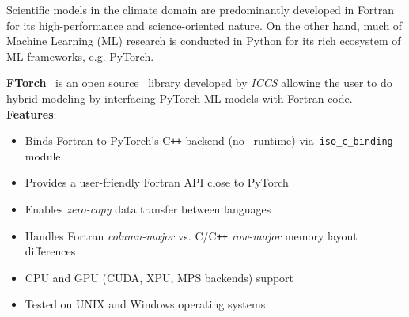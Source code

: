 Scientific models in the climate domain are predominantly developed in Fortran for its high-performance and science-oriented nature. On the other hand, much of Machine Learning (ML) research is conducted in Python for its rich ecosystem of ML frameworks, e.g. PyTorch. 

\textbf{FTorch}~\citep{Atkinson2025} is an open source \href{https://github.com/Cambridge-ICCS/FTorch}{\textcolor{black}{\faGithub}}~library developed by \emph{ICCS} allowing the user to do hybrid modeling by interfacing PyTorch ML models with Fortran code. \\
\textbf{Features}:
\begin{itemize}
    \item Binds Fortran to PyTorch's C\texttt{++} backend (no \faPython~runtime) via~\texttt{iso\_c\_binding} module
    \item Provides a user-friendly Fortran API close to PyTorch
    \item Enables \emph{zero-copy} data transfer between languages
    \item Handles Fortran \emph{column-major} vs. C/C\texttt{++} \emph{row-major} memory layout differences
    \item CPU and GPU (CUDA, XPU, MPS backends) support
    \item Tested on UNIX and Windows operating systems
\end{itemize}


